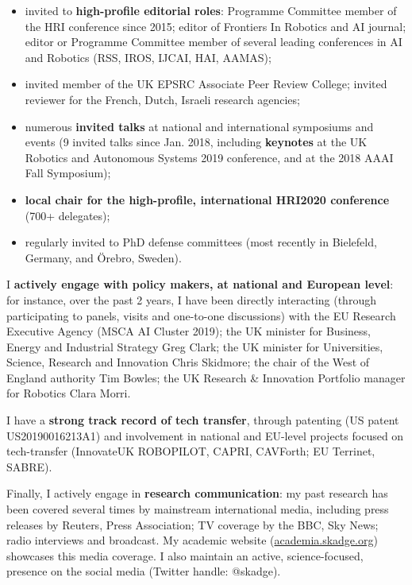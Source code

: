 \begin{itemize}[noitemsep,topsep=0pt,parsep=0pt,partopsep=0pt]
    \item invited to \textbf{high-profile editorial roles}: Programme Committee member of the HRI
conference since 2015; editor of Frontiers In Robotics and AI journal; editor or
Programme Committee member of several leading conferences in AI and Robotics
        (RSS, IROS, IJCAI, HAI, AAMAS);
    \item invited member of the UK EPSRC Associate Peer Review College;
        invited reviewer for the French, Dutch, Israeli research agencies;
    \item numerous \textbf{invited talks} at national and international symposiums and
        events (9 invited talks since Jan. 2018, including \textbf{keynotes} at the UK Robotics
and Autonomous Systems 2019 conference, and at the 2018 AAAI Fall Symposium);
    \item \textbf{local chair for the high-profile, international HRI2020
        conference} (700+ delegates);
    \item regularly invited to PhD defense committees (most recently in
        Bielefeld, Germany, and Örebro, Sweden).
\end{itemize}


\vspace{1em} 

I \textbf{actively engage with policy makers, at national and European
level}: for instance, over the past 2 years, I have been directly interacting
(through participating to panels, visits and one-to-one discussions) with the EU
Research Executive Agency (MSCA AI Cluster 2019); the UK minister for Business,
Energy and Industrial Strategy Greg Clark; the UK minister for Universities,
Science, Research and Innovation Chris Skidmore; the chair of the West of
England authority Tim Bowles; the UK Research \& Innovation Portfolio
manager for Robotics Clara Morri.

I have a \textbf{strong track record of tech transfer}, through patenting (US patent
US20190016213A1) and involvement in national and EU-level projects focused on
tech-transfer (InnovateUK ROBOPILOT, CAPRI, CAVForth; EU Terrinet, SABRE).

Finally, I actively engage in \textbf{research communication}: my past research has been
covered several times by mainstream international media, including press
releases by Reuters, Press Association; TV coverage by the BBC, Sky News; radio
interviews and broadcast. My academic website (\url{academia.skadge.org})
showcases this media coverage. I also maintain an active, science-focused,
presence on the social media (Twitter handle: @skadge).



